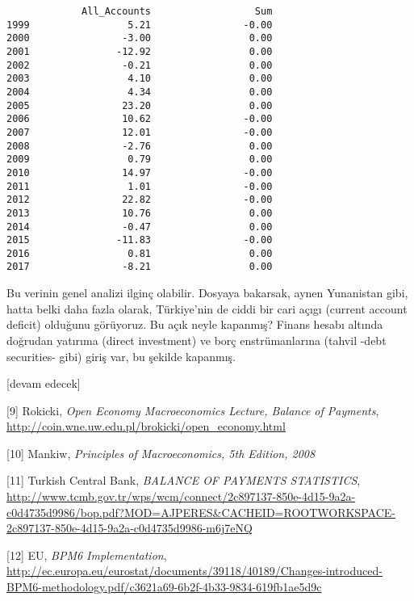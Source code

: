 \documentclass[12pt,fleqn]{article}\usepackage{../../common}
\begin{document}
\begin{verbatim}
             All_Accounts                  Sum
1999                 5.21                -0.00
2000                -3.00                 0.00
2001               -12.92                 0.00
2002                -0.21                 0.00
2003                 4.10                 0.00
2004                 4.34                 0.00
2005                23.20                 0.00
2006                10.62                -0.00
2007                12.01                -0.00
2008                -2.76                 0.00
2009                 0.79                 0.00
2010                14.97                -0.00
2011                 1.01                -0.00
2012                22.82                -0.00
2013                10.76                 0.00
2014                -0.47                 0.00
2015               -11.83                -0.00
2016                 0.81                 0.00
2017                -8.21                 0.00
\end{verbatim}

Bu verinin genel analizi ilginç olabilir. Dosyaya bakarsak, aynen
Yunanistan gibi, hatta belki daha fazla olarak, Türkiye'nin de ciddi bir
cari açıgı (current account deficit) olduğunu görüyoruz. Bu açık neyle
kapanmış?  Finans hesabı altında doğrudan yatırıma (direct investment) ve
borç enstrümanlarına (tahvil -debt securities- gibi) giriş var, bu şekilde
kapanmış.

[devam edecek]


[9] Rokicki, {\em Open Economy Macroeconomics Lecture, Balance of Payments}, 
    \url{http://coin.wne.uw.edu.pl/brokicki/open_economy.html}

[10] Mankiw, {\em Principles of Macroeconomics, 5th Edition, 2008} 

[11] Turkish Central Bank, {\em BALANCE OF PAYMENTS STATISTICS}, 
     \url{http://www.tcmb.gov.tr/wps/wcm/connect/2c897137-850e-4d15-9a2a-c0d4735d9986/bop.pdf?MOD=AJPERES&CACHEID=ROOTWORKSPACE-2c897137-850e-4d15-9a2a-c0d4735d9986-m6j7eNQ}

[12] EU, {\em BPM6 Implementation}, 
     \url{http://ec.europa.eu/eurostat/documents/39118/40189/Changes-introduced-BPM6-methodology.pdf/c3621a69-6b2f-4b33-9834-619fb1ae5d9c}
\end{document}
